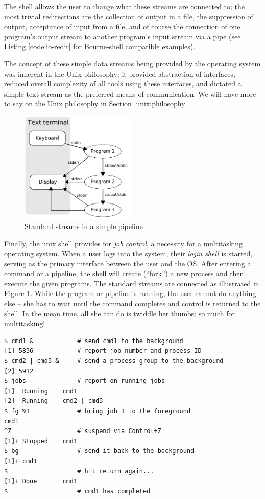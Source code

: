The shell allows the user to change what these streams
are connected to; the most trivial redirections are
the collection of output in a file, the suppression of
output, acceptance of input from a file, and of course
the connection of one program's output stream to
another program's input stream via a pipe (see
Listing \ref{code:io-redir} for Bourne-shell
compatible examples).

The concept of these simple data streams being
provided by the operating system was inherent in the
Unix philosophy: it provided
abstraction of interfaces, reduced overall complexity
of all tools using these interfaces, and dictated a
simple text stream as the preferred means of
communication.  We will have more to say on the Unix
philosophy in Section \ref{unix:philosophy}.

\begin{figure}[t]
	\centering
	\includegraphics[width=0.5\textwidth]{02/pics/pipeline}
	\caption{Standard streams in a simple pipeline
		\label{fig:streams-pipeline}}
\end{figure}


Finally, the unix shell provides for {\em  job
control}, a necessity for a
multitasking operating system.  When a user logs into
the system, their {\em  login shell} is started, serving as the primary interface
between the user and the OS.  After entering a command
or a pipeline, the shell will create (``fork'') a new
process and then execute the given programs.  The
standard streams are connected as illustrated in
Figure \ref{fig:streams-pipeline}.  While the program
or pipeline is running, the user cannot do anything
else -- she has to wait until the command completes
and control is returned to the shell.  In the mean
time, all she can do is twiddle her thumbs; so much
for multitasking!

\begin{lstlisting}[float,label=code:sh-jobcontrol,caption=Simple job control in the shell]
$ cmd1 &            # send cmd1 to the background
[1] 5836            # report job number and process ID
$ cmd2 | cmd3 &     # send a process group to the background
[2] 5912
$ jobs              # report on running jobs
[1]  Running    cmd1
[2]  Running    cmd2 | cmd3
$ fg %1             # bring job 1 to the foreground
cmd1
^Z                  # suspend via Control+Z
[1]+ Stopped    cmd1
$ bg                # send it back to the background
[1]+ cmd1
$                   # hit return again...
[1]+ Done       cmd1
$                   # cmd1 has completed
\end{lstlisting}

